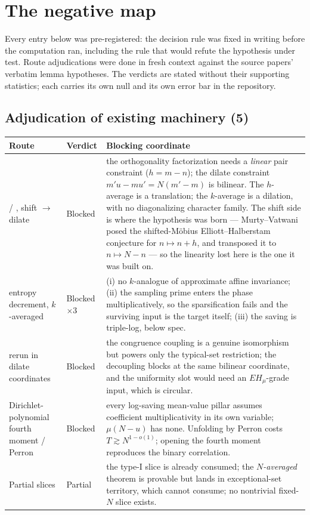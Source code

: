 \documentclass[11pt,a4paper]{article}
\theoremstyle{plain}
\theoremstyle{definition}
\theoremstyle{remark}
\begin{document}
\section{The negative map}\label{sec:closures}

Every entry below was pre-registered: the decision rule was fixed in
writing before the computation ran, including the rule that would
refute the hypothesis under test. Route adjudications were done in
fresh context against the source papers' verbatim lemma hypotheses.
The verdicts are stated without their supporting statistics; each
carries its own null and its own error bar in the repository.

\subsection{Adjudication of existing machinery (5)}

\begin{longtable}{p{}p{}p{}}
\hline
Route & Verdict & Blocking coordinate\\
\hline
\endhead
\cite{MRT15} / \cite{LiSP}, shift $\to$ dilate & Blocked &
 the orthogonality factorization needs a \emph{linear} pair
 constraint ($h=m-n$); the dilate constraint $m'u-mu'=N(m'-m)$ is
 bilinear. The $h$-average is a translation; the $k$-average is a
 dilation, with no diagonalizing character family. The shift side is
 where the hypothesis was born --- Murty--Vatwani \cite{MV17} posed
 the shifted-M\"obius Elliott--Halberstam conjecture for
 $n\mapsto n+h$, and \cite{HL} transposed it to $n\mapsto N-n$ --- so
 the linearity lost here is the one it was built on.\\
\cite{Tao16} entropy decrement, $k$-averaged & Blocked $\times3$ &
 (i) no $k$-analogue of approximate affine invariance; (ii) the
 sampling prime enters the phase multiplicatively, so the
 sparsification fails and the surviving input is the target itself;
 (iii) the saving is triple-log, below spec.\\
\cite{Li23} rerun in dilate coordinates & Blocked &
 the congruence coupling is a genuine isomorphism but powers only the
 typical-set restriction; the decoupling blocks at the same bilinear
 coordinate, and the uniformity slot would need an $EH_\mu$-grade
 input, which is circular.\\
Dirichlet-polynomial fourth moment / Perron & Blocked &
 every log-saving mean-value pillar assumes coefficient
 multiplicativity in its own variable; $\mu(N-u)$ has none. Unfolding
 by Perron costs $T\gtrsim N^{1-o(1)}$; opening the fourth moment
 reproduces the binary correlation.\\
Partial slices & Partial &
 the type-I slice is already consumed; the \emph{$N$-averaged}
 theorem is provable but lands in exceptional-set territory, which
 \cite{HL} cannot consume; no nontrivial fixed-$N$ slice exists.\\
\hline
\end{longtable}
\end{document}
